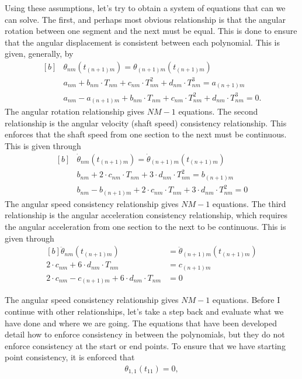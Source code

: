\documentclass{article}
\begin{document}
	Using these assumptions, let's try to obtain a system of equations that can we can solve. The first, and perhaps most obvious relationship is that the angular rotation between one segment and the next must be equal. This is done to ensure that the angular displacement is consistent between each polynomial. This is given, generally, by
	\begin{equation}
		\begin{aligned}[b]
			&\theta_{nm}(t_{(n+1)m}) = \theta_{(n+1)m}(t_{(n + 1)m}) \\
			&a_{nm} + b_{nm}\cdot T_{nm} + c_{nm}\cdot T_{nm}^2 + d_{nm}\cdot T_{nm}^3 = a_{(n+1)m} \\
			&a_{nm} - a_{(n+1)m} + b_{nm}\cdot T_{nm} + c_{nm}\cdot T_{nm}^2 + d_{nm}\cdot T_{nm}^3 = 0.
		\end{aligned}
	\end{equation}
	The angular rotation relationship gives $NM-1$ equations. The second relationship is the angular velocity (shaft speed) consistency relationship. This enforces that the shaft speed from one section to the next must be continuous. This is given through
	\begin{equation}
	\begin{aligned}[b]
		&\dot{\theta}_{nm}(t_{(n+1)m}) = \dot{\theta}_{(n+1)m}(t_{(n + 1)m}) \\
		&b_{nm} + 2 \cdot c_{nm}\cdot T_{nm} + 3 \cdot d_{nm}\cdot T_{nm}^2 = b_{(n+1)m} \\
		&b_{nm} - b_{(n+1)m} + 2 \cdot c_{nm}\cdot T_{nm} + 3 \cdot d_{nm}\cdot T_{nm}^2 = 0
	\end{aligned}
	\end{equation}
	The angular speed consistency relationship gives $NM-1$ equations. The third relationship is the angular acceleration consistency relationship, which requires the angular acceleration from one section to the next to be continuous. This is given through
	\begin{equation}
		\begin{aligned}[b]
			\ddot{\theta}_{nm}(t_{(n+1)m}) &= \ddot{\theta}_{(n+1)m}(t_{(n + 1)m}) \\
			2 \cdot c_{nm} + 6 \cdot d_{nm}\cdot T_{nm} &= c_{(n+1)m} \\
			2 \cdot c_{nm} - c_{(n+1)m} + 6 \cdot d_{nm}\cdot T_{nm} &= 0 
		\end{aligned}
	\end{equation}

	The angular speed consistency relationship gives $NM-1$ equations. Before I continue with other relationships, let's take a step back and evaluate what we have done and where we are going. The equations that have been developed detail how to enforce consistency in between the polynomials, but they do not enforce consistency at the start or end points. To ensure that we have starting point consistency, it is enforced that 
	\begin{equation}
		\begin{aligned}
		\theta_{1, 1}(t_{11}) = 0,
		\end{aligned}
	\end{equation} 
	
\end{document}
